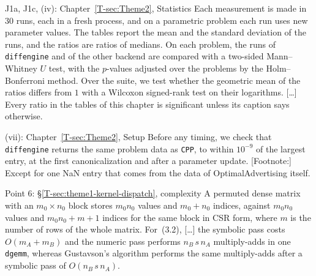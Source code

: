 \documentclass[letterpaper,12pt]{article}
\newcommand{\ac}[1]{#1}
\newcommand{\tsec}[1]{\S\ref{T-#1}}
\begin{document}
\begin{thesisquote}{J1a, J1c, (iv): Chapter~\ref{T-sec:Theme2}, Statistics}
Each measurement is made in $30$ runs, each in a fresh process, and on a parametric problem
each run uses new parameter values. The tables report the mean and the standard deviation of the
runs, and the ratios are ratios of medians. On each problem, the runs of \texttt{diffengine} and
of the other backend are compared with a two-sided Mann--Whitney $U$ test, with the $p$-values
adjusted over the problems by the Holm--Bonferroni method. Over the suite, we test whether the
geometric mean of the ratios differs from $1$ with a Wilcoxon signed-rank test on their
logarithms. [\ldots] Every ratio
in the tables of this chapter is significant unless its caption says otherwise.
\end{thesisquote}
\begin{thesisquote}{(vii): Chapter~\ref{T-sec:Theme2}, Setup}
Before any timing, we check that \texttt{diffengine} returns the same problem data as
\texttt{CPP}, to within $10^{-9}$ of the largest entry, at the first canonicalization and after
a parameter update. [Footnote:] Except
for one NaN entry that comes from the data of OptimalAdvertising itself.
\end{thesisquote}
\begin{thesisquote}{Point 6: \tsec{sec:theme1-kernel-dispatch}, complexity}
A permuted dense matrix with an $m_0 \times n_0$ block stores $m_0 n_0$ values and $m_0 + n_0$
indices, against $m_0 n_0$ values and $m_0 n_0 + m + 1$ indices for the same block in \ac{CSR}
form, where $m$ is the number of rows of the whole matrix. For~(3.2), [\ldots] the symbolic pass
costs $O(m_A + m_B)$ and the numeric pass performs $n_B\, s\, n_A$ multiply-adds in one
\texttt{dgemm}, whereas Gustavson's algorithm performs the same multiply-adds after a symbolic
pass of $O(n_B\, s\, n_A)$.
\end{thesisquote}
\end{document}
